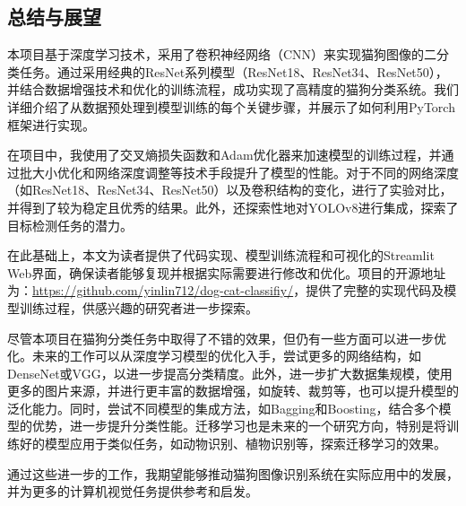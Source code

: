 \documentclass[10.5pt,compsoc]{CjC}
\theoremstyle{mystyle}
\begin{document}
\begin{CJK*}{GBK}{song}
\section{总结与展望}

本项目基于深度学习技术，采用了卷积神经网络（CNN）来实现猫狗图像的二分类任务。通过采用经典的ResNet系列模型（ResNet18、ResNet34、ResNet50），并结合数据增强技术和优化的训练流程，成功实现了高精度的猫狗分类系统。我们详细介绍了从数据预处理到模型训练的每个关键步骤，并展示了如何利用PyTorch框架进行实现。

在项目中，我使用了交叉熵损失函数和Adam优化器来加速模型的训练过程，并通过批大小优化和网络深度调整等技术手段提升了模型的性能。对于不同的网络深度（如ResNet18、ResNet34、ResNet50）以及卷积结构的变化，进行了实验对比，并得到了较为稳定且优秀的结果。此外，还探索性地对YOLOv8进行集成，探索了目标检测任务的潜力。

在此基础上，本文为读者提供了代码实现、模型训练流程和可视化的Streamlit Web界面，确保读者能够复现并根据实际需要进行修改和优化。项目的开源地址为：\url{https://github.com/yinlin712/dog-cat-classifiy/}，提供了完整的实现代码及模型训练过程，供感兴趣的研究者进一步探索。

尽管本项目在猫狗分类任务中取得了不错的效果，但仍有一些方面可以进一步优化。未来的工作可以从深度学习模型的优化入手，尝试更多的网络结构，如DenseNet或VGG，以进一步提高分类精度。此外，进一步扩大数据集规模，使用更多的图片来源，并进行更丰富的数据增强，如旋转、裁剪等，也可以提升模型的泛化能力。同时，尝试不同模型的集成方法，如Bagging和Boosting，结合多个模型的优势，进一步提升分类性能。迁移学习也是未来的一个研究方向，特别是将训练好的模型应用于类似任务，如动物识别、植物识别等，探索迁移学习的效果。

通过这些进一步的工作，我期望能够推动猫狗图像识别系统在实际应用中的发展，并为更多的计算机视觉任务提供参考和启发。











\end{CJK*}
\end{document}
